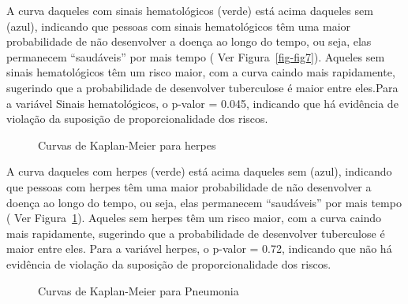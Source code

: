\documentclass[
  letterpaper,
  DIV=11,
  numbers=noendperiod]{scrreprt}
\begin{document}
A curva daqueles com sinais hematológicos (verde) está acima daqueles
sem (azul), indicando que pessoas com sinais hematológicos têm uma maior
probabilidade de não desenvolver a doença ao longo do tempo, ou seja,
elas permanecem ``saudáveis'' por mais tempo ( Ver
Figura~\ref{fig-fig7}). Aqueles sem sinais hematológicos têm um risco
maior, com a curva caindo mais rapidamente, sugerindo que a
probabilidade de desenvolver tuberculose é maior entre eles.Para a
variável Sinais hematológicos, o p-valor = 0.045, indicando que há
evidência de violação da suposição de proporcionalidade dos riscos.

\begin{figure}

\caption{\label{fig-fig8}Curvas de Kaplan-Meier para herpes}


\end{figure}%

A curva daqueles com herpes (verde) está acima daqueles sem (azul),
indicando que pessoas com herpes têm uma maior probabilidade de não
desenvolver a doença ao longo do tempo, ou seja, elas permanecem
``saudáveis'' por mais tempo ( Ver Figura~\ref{fig-fig8}). Aqueles sem
herpes têm um risco maior, com a curva caindo mais rapidamente,
sugerindo que a probabilidade de desenvolver tuberculose é maior entre
eles. Para a variável herpes, o p-valor = 0.72, indicando que não há
evidência de violação da suposição de proporcionalidade dos riscos.

\begin{figure}

\caption{\label{fig-fig9}Curvas de Kaplan-Meier para Pneumonia}


\end{figure}%
\end{document}
